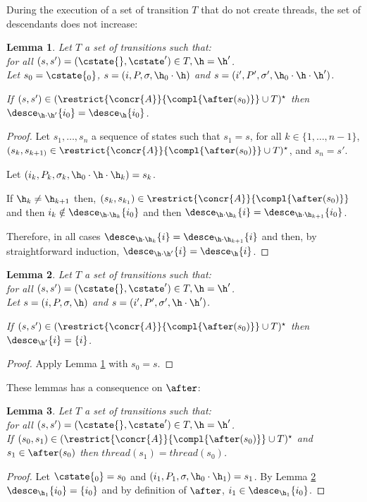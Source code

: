 \documentclass[12pt]{article}
\let\firstunion\cup
\let\cup\firstunion
\newcommand{\thread}{\mathit{thread}}
\newtheorem{lemma}{Lemma}
\begin{document}
During the execution of a set of transition \(T\) that do not create threads, the set of descendants does not increase:
\begin{lemma} \label{lemma:Ndesce}
 Let \(T\) a set of transitions such that:\\ for all \((s,s')=(\cstate{},\cstate')\in T, \h=\h'\).\\
 Let \(s_0=\cstate{_0}\),  \(s=(i,P,\m,\h_0\cdot\h)\) and \(s=(i',P',\m',\h_0\cdot\h\cdot\h')\).
 
 If \((s,s')\in( \restrict{\concr{A}}{\compl{\after(s_0)}}\cup T)^{\star}\) then \(\desce_{\h\cdot\h'}\{i_0\}=\desce_{\h}\{i_0\}\).
\end{lemma}
\begin{proof}
 Let \(s_1,\ldots,s_n\) a sequence of states such that \(s_1=s\), for all \(k\in\{1,\ldots,n-1\}\), \((s_k,s_{k+1)}\in \restrict{\concr{A}}{\compl{\after(s_0)}}\cup T)^{\star}\), and \(s_n=s'\).
 
 Let \((i_k,P_k,\m_k,\h_0\cdot\h\cdot\h_k)=s_k\).
 
 If \(\h_k\neq\h_{k+1}\) then, \((s_k,s_{k_1})\in\restrict{\concr{A}}{\compl{\after(s_0)}}\) and then \(i_k\notin \desce_{\h\cdot\h_k}\{i_0\} \) and then \(\desce_{\h\cdot\h_k}\{i\}=\desce_{\h\cdot\h_{k+1}}\{i_0\}\).
 
 Therefore, in all cases \(\desce_{\h\cdot\h_k}\{i\}=\desce_{\h\cdot\h_{k+1}}\{i\}\) and then, by straightforward induction, \(\desce_{\h\cdot\h'}\{i\}=\desce_{\h}\{i\}\).
 \end{proof}

\begin{lemma} \label{lemma:Ndescew}
 Let \(T\) a set of transitions such that:\\ for all \((s,s')=(\cstate{},\cstate')\in T, \h=\h'\).\\
 Let \(s=(i,P,\m,\h)\) and \(s=(i',P',\m',\h\cdot\h')\).
 
 If \((s,s')\in( \restrict{\concr{A}}{\compl{\after(s_0)}}\cup T)^{\star}\) then \(\desce_{\h'}\{i\}=\{i\}\).
\end{lemma}
\begin{proof}
 Apply Lemma \ref{lemma:Ndesce} with \(s_0=s\).
\end{proof}

These lemmas has a consequence on \(\after\):

\begin{lemma}\label{lemma:E'}
Let \(T\) a set of transitions such that:\\ for all \((s,s')=(\cstate{},\cstate')\in T, \h=\h'\).\\
If \((s_0,s_1)\in( \restrict{\concr{A}}{\compl{\after(s_0)}}\cup T)^{\star}\) and \(s_1\in\after(s_0)\) then
\(\thread(s_1) = \thread(s_0)\).
\end{lemma}
\begin{proof}
 Let \(\cstate{_0} =s_0 \) and \((i_1,P_1,\m,\h_0\cdot\h_1)=s_1\).
 By Lemma \ref{lemma:Ndescew} \(\desce_{\h_1}\{i_0\}=\{i_0\}\) and by definition of \(\after\), \(i_1\in \desce_{\h_1}\{i_0\}\).
\end{proof}
\end{document}
